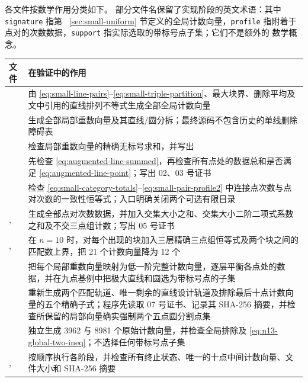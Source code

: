 各文件按数学作用分类如下。
部分文件名保留了实现阶段的英文术语：其中 \texttt{signature} 指第
~\ref{sec:small-uniform} 节定义的全局计数向量，\texttt{profile} 指附着于
点对的次数数据，\texttt{support} 指实际选取的带标号点子集；它们不是额外的
数学概念。
\begin{longtable}{P{6.2cm}P{8.3cm}}
\toprule 文件 & 在验证中的作用\\ \midrule
{} & 由
\eqref{eq:small-line-pairs}--\eqref{eq:small-triple-partition}、最大块界、删除平均及文中引用的直线排列不等式生成全部全局计数向量\\
 & 生成全部局部重数向量及其直线/圆分拆；最终源码不包含历史的单线删除障碍表\\
 & 检查局部重数向量的精确无标号求和，并写出
\\
 & 先检查
\eqref{eq:augmented-line-summed}，再检查所有点处的数据总和是否满足
\eqref{eq:augmented-line-point}；写出 02、03 号证书\\
 & 检查
\eqref{eq:small-category-totals}--\eqref{eq:small-pair-profile2} 中连接点次数与点对次数的一致性恒等式；入口明确关闭两个可选有限目录\\
,
 & 生成全部点对次数数据，并加入交集大小之和、交集大小二阶二项式系数之和及不交三点组计数；写出 05 号证书\\
,
 & 在 $n=10$ 时，对每个出现的块加入三层精确三点组恒等式及两个块之间的匹配数上界，把 21 个计数向量降为 12 个\\
 & 把每个局部重数向量映射为低一阶完整计数向量，逐层平衡各点处的数据，并在九点基例中把极大直线和圆选为带标号点的子集\\
 & 重新生成两个匹配轨道、唯一剩余的直线设计轨道及排除最后十点计数向量的五个精确子式；程序先读取 07 号证书、记录其 SHA-256 摘要，并检查所保留的局部向量确实强制两个五点圆分割点集\\
 & 独立生成 3962 与 8981 个原始计数向量，并检查全局排除及
\eqref{eq:n13-global-two-ineq}；不选择任何带标号点子集\\
,  & 按顺序执行各阶段，并检查所有终止状态、唯一的十点中间计数向量、文件大小和 SHA-256 摘要\\
\bottomrule
\end{longtable}

